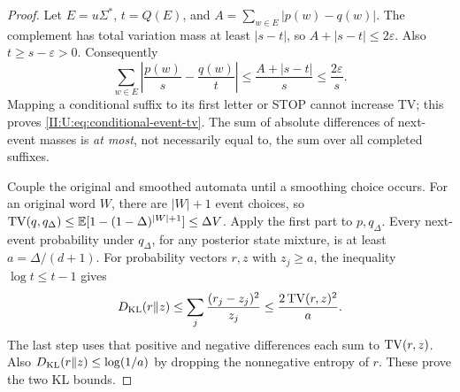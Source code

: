 \begin{proof}
Let $E=u\Sigma^*$, $t=Q(E)$, and
$A=\sum_{w\in E}|p(w)-q(w)|$. The complement has total variation
mass at least $|s-t|$, so $A+|s-t|\le2\varepsilon$.
Also $t\ge s-\varepsilon>0$. Consequently
\[
 \sum_{w\in E}\left|\frac{p(w)}s-\frac{q(w)}t\right|
 \le\frac{A+|s-t|}{s}\le\frac{2\varepsilon}s.
\]
Mapping a conditional suffix to its first letter or STOP cannot
increase TV; this proves \eqref{II:U:eq:conditional-event-tv}.
The sum of absolute differences of next-event masses is \emph{at most},
not necessarily equal to, the sum over all completed suffixes.

Couple the original and smoothed automata until a smoothing choice
occurs. For an original word $W$, there are $|W|+1$ event choices, so
$\operatorname{TV}(q,q_\Delta)\le
\mathbb E[1-(1-\Delta)^{|W|+1}]\le\Delta V$.
Apply the first part to $p,q_\Delta$. Every next-event probability
under $q_\Delta$, for any posterior state mixture, is at least
$a=\Delta/(d+1)$. For probability vectors $r,z$ with $z_j\ge a$,
the inequality $\log t\le t-1$ gives
\[
 D_{\rm KL}(r\|z)\le\sum_j\frac{(r_j-z_j)^2}{z_j}
 \le\frac{2\operatorname{TV}(r,z)^2}{a}.
\]
The last step uses that positive and negative differences each sum to
$\operatorname{TV}(r,z)$. Also $D_{\rm KL}(r\|z)\le\log(1/a)$ by dropping
the nonnegative entropy of $r$. These prove the two KL bounds.
\end{proof}
